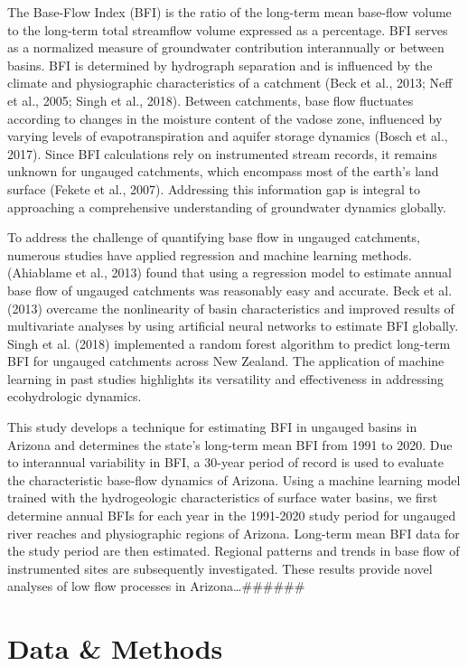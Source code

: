 \documentclass[
]{agujournal2019}
\begin{document}
The Base-Flow Index (BFI) is the ratio of the long-term mean base-flow
volume to the long-term total streamflow volume expressed as a
percentage. BFI serves as a normalized measure of groundwater
contribution interannually or between basins. BFI is determined by
hydrograph separation and is influenced by the climate and physiographic
characteristics of a catchment (Beck et al., 2013; Neff et al., 2005;
Singh et al., 2018). Between catchments, base flow fluctuates according
to changes in the moisture content of the vadose zone, influenced by
varying levels of evapotranspiration and aquifer storage dynamics (Bosch
et al., 2017). Since BFI calculations rely on instrumented stream
records, it remains unknown for ungauged catchments, which encompass
most of the earth's land surface (Fekete et al., 2007). Addressing this
information gap is integral to approaching a comprehensive understanding
of groundwater dynamics globally.

To address the challenge of quantifying base flow in ungauged
catchments, numerous studies have applied regression and machine
learning methods. (Ahiablame et al., 2013) found that using a regression
model to estimate annual base flow of ungauged catchments was reasonably
easy and accurate. Beck et al. (2013) overcame the nonlinearity of basin
characteristics and improved results of multivariate analyses by using
artificial neural networks to estimate BFI globally. Singh et al. (2018)
implemented a random forest algorithm to predict long-term BFI for
ungauged catchments across New Zealand. The application of machine
learning in past studies highlights its versatility and effectiveness in
addressing ecohydrologic dynamics.

This study develops a technique for estimating BFI in ungauged basins in
Arizona and determines the state's long-term mean BFI from 1991 to 2020.
Due to interannual variability in BFI, a 30-year period of record is
used to evaluate the characteristic base-flow dynamics of Arizona. Using
a machine learning model trained with the hydrogeologic characteristics
of surface water basins, we first determine annual BFIs for each year in
the 1991-2020 study period for ungauged river reaches and physiographic
regions of Arizona. Long-term mean BFI data for the study period are
then estimated. Regional patterns and trends in base flow of
instrumented sites are subsequently investigated. These results provide
novel analyses of low flow processes in Arizona\ldots\#\#\#\#\#\#

\section{Data \& Methods}\label{sec-data-methods}
\end{document}
